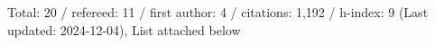 Total: 20 / refereed: 11 / first author: 4 / citations: 1,192 / h-index: 9 (Last updated: 2024-12-04), List attached below